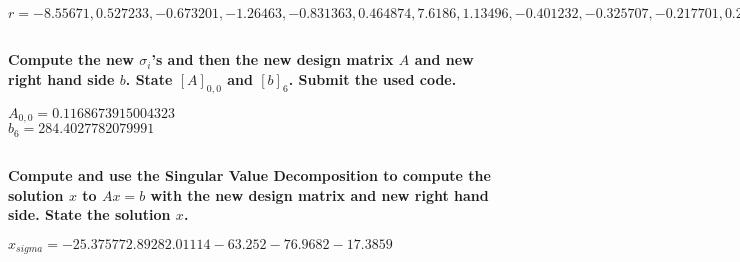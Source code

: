 \documentclass{article}
\begin{document}
$r = -8.55671, 0.527233, -0.673201, -1.26463, -0.831363, 0.464874, 7.6186, 1.13496, -0.401232, -0.325707, -0.217701, 0.230878, -0.218717, 0.656575, -0.0388285, -0.535747, 0.752, 515, 0.561871, 0.324391, -0.743685, -0.744122, 1.0811, -0.605121, -0.362054, 0.341041, -0.89615, -0.411017, -0.0485407, 1.13667, 1.08557, -0.627664, -0.400131, 1.06093, 0.132202, 0.55506, 0.408264, 0.87311, -0.680265, 0.400403, -0.763662$

\subsection{}
\textbf{Compute the new $\sigma_i$'s and then the new design matrix $A$ and new right hand side $b$. State $[A]_{0,0}$ and $[b]_6$. Submit the used code.}

$A_{0,0} = 0.1168673915004323$\\
$b_6=284.4027782079991$

\subsection{}
\textbf{Compute and use the Singular Value Decomposition to compute the solution $x$ to $Ax = b$ with the new design matrix and new right hand side. State the solution $x$.}

$x_{sigma} = -25.3757 72.8928 2.01114 -63.252 -76.9682 -1 7.3859$
\end{document}
